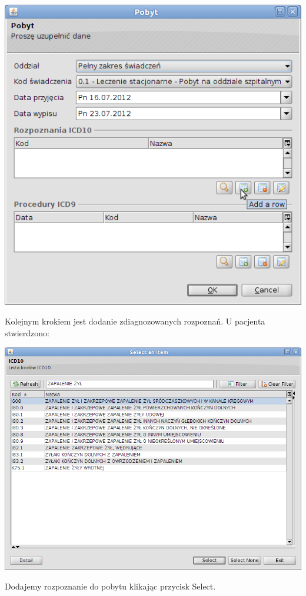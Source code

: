 \includegraphics[scale=0.4]{images/gruper2}

Kolejnym krokiem jest dodanie zdiagnozowanych rozpoznań. U pacjenta stwierdzono:

\includegraphics[scale=0.4]{images/gruper3}

Dodajemy rozpoznanie do pobytu klikając przycisk Select.

